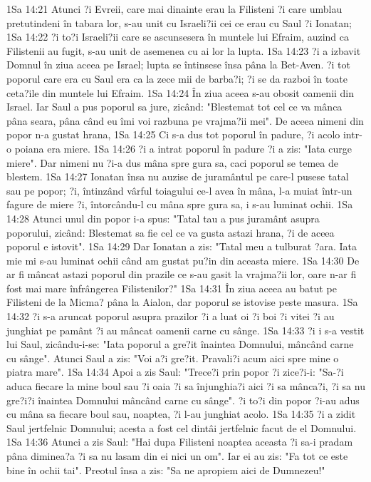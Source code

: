 1Sa 14:21  Atunci ?i Evreii, care mai dinainte erau la Filisteni ?i care umblau pretutindeni în tabara lor, s-au unit cu Israeli?ii cei ce erau cu Saul ?i Ionatan;
1Sa 14:22  ?i to?i Israeli?ii care se ascunsesera în muntele lui Efraim, auzind ca Filistenii au fugit, s-au unit de asemenea cu ai lor la lupta.
1Sa 14:23  ?i a izbavit Domnul în ziua aceea pe Israel; lupta se întinsese însa pâna la Bet-Aven. ?i tot poporul care era cu Saul era ca la zece mii de barba?i; ?i se da razboi în toate ceta?ile din muntele lui Efraim.
1Sa 14:24  În ziua aceea s-au obosit oamenii din Israel. Iar Saul a pus poporul sa jure, zicând: "Blestemat tot cel ce va mânca pâna seara, pâna când eu îmi voi razbuna pe vrajma?ii mei". De aceea nimeni din popor n-a gustat hrana,
1Sa 14:25  Ci s-a dus tot poporul în padure, ?i acolo intr-o poiana era miere.
1Sa 14:26  ?i a intrat poporul în padure ?i a zis: "Iata curge miere". Dar nimeni nu ?i-a dus mâna spre gura sa, caci poporul se temea de blestem.
1Sa 14:27  Ionatan însa nu auzise de juramântul pe care-l pusese tatal sau pe popor; ?i, întinzând vârful toiagului ce-l avea în mâna, l-a muiat într-un fagure de miere ?i, întorcându-l cu mâna spre gura sa, i s-au luminat ochii.
1Sa 14:28  Atunci unul din popor i-a spus: "Tatal tau a pus juramânt asupra poporului, zicând: Blestemat sa fie cel ce va gusta astazi hrana, ?i de aceea poporul e istovit".
1Sa 14:29  Dar Ionatan a zis: "Tatal meu a tulburat ?ara. Iata mie mi s-au luminat ochii când am gustat pu?in din aceasta miere.
1Sa 14:30  De ar fi mâncat astazi poporul din prazile ce s-au gasit la vrajma?ii lor, oare n-ar fi fost mai mare înfrângerea Filistenilor?"
1Sa 14:31  În ziua aceea au batut pe Filisteni de la Micma? pâna la Aialon, dar poporul se istovise peste masura.
1Sa 14:32  ?i s-a aruncat poporul asupra prazilor ?i a luat oi ?i boi ?i vitei ?i au junghiat pe pamânt ?i au mâncat oamenii carne cu sânge.
1Sa 14:33  ?i i s-a vestit lui Saul, zicându-i-se: "Iata poporul a gre?it înaintea Domnului, mâncând carne cu sânge". Atunci Saul a zis: "Voi a?i gre?it. Pravali?i acum aici spre mine o piatra mare".
1Sa 14:34  Apoi a zis Saul: "Trece?i prin popor ?i zice?i-i: "Sa-?i aduca fiecare la mine boul sau ?i oaia ?i sa înjunghia?i aici ?i sa mânca?i, ?i sa nu gre?i?i înaintea Domnului mâncând carne cu sânge". ?i to?i din popor ?i-au adus cu mâna sa fiecare boul sau, noaptea, ?i l-au junghiat acolo.
1Sa 14:35  ?i a zidit Saul jertfelnic Domnului; acesta a fost cel dintâi jertfelnic facut de el Domnului.
1Sa 14:36  Atunci a zis Saul: "Hai dupa Filisteni noaptea aceasta ?i sa-i pradam pâna diminea?a ?i sa nu lasam din ei nici un om". Iar ei au zis: "Fa tot ce este bine în ochii tai". Preotul însa a zis: "Sa ne apropiem aici de Dumnezeu!"

